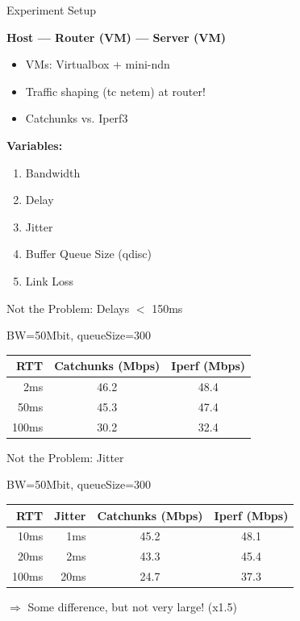 \begin{frame}{Experiment Setup}

\textbf{Host --- Router (VM) --- Server (VM)}

\pause
\begin{itemize}
\item VMs: Virtualbox + mini-ndn
\item Traffic shaping (tc netem) at router!
\item Catchunks vs. Iperf3
\end{itemize}

\pause

\textbf{Variables:}
\begin{enumerate}
\item Bandwidth
\item Delay
\item Jitter
\item Buffer Queue Size (qdisc)
\item Link Loss
\end{enumerate}

\end{frame}


\begin{frame}[fragile]{Not the Problem: Delays $<$ 150ms}

BW=50Mbit, queueSize=300
\vspace{1em}

\begin{tabular}{rcc}
\toprule
\textbf{RTT} & \textbf{Catchunks (Mbps)} & \textbf{Iperf (Mbps)} \\ 
\midrule
2ms 	& 46.2  & 48.4 \\
50ms	& 45.3  & 47.4 \\
100ms & 30.2	& 32.4 \\
\bottomrule
\end{tabular}

\end{frame}


\begin{frame}[fragile]{Not the Problem: Jitter}

BW=50Mbit, queueSize=300
\vspace{1em}

\begin{tabular}{rrcc}
\toprule
\textbf{RTT} & \textbf{Jitter} &  \textbf{Catchunks (Mbps)} & \textbf{Iperf (Mbps)} \\ 
\midrule
10ms 	& 1ms		& 45.2  & 48.1 \\
20ms 	& 2ms		& 43.3  & 45.4 \\
100ms	& 20ms	& 24.7  & 37.3 \\
\bottomrule
\end{tabular}

\vspace*{1em}

$\Rightarrow$ Some difference, but not very large! (x1.5)

\end{frame}




